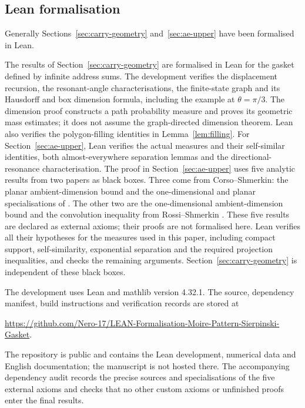 \documentclass[scheme=plain]{ctexart}
\begin{document}
\subsection{Lean formalisation}
Generally Sections~\ref{sec:carry-geometry} and~\ref{sec:ae-upper} have been formalised in Lean.

The results of Section~\ref{sec:carry-geometry} are formalised in Lean for the gasket defined by infinite address sums.
The development verifies the displacement recursion, the resonant-angle characterisations, the finite-state graph and its Hausdorff and box dimension formula, including the example at $\theta=\pi/3$.
The dimension proof constructs a path probability measure and proves its geometric mass estimates; it does not assume the graph-directed dimension theorem.
Lean also verifies the polygon-filling identities in Lemma~\ref{lem:filling}.
For Section~\ref{sec:ae-upper}, Lean verifies the actual measures and their self-similar identities, both almost-everywhere separation lemmas and the directional-resonance characterisation.
The proof in Section~\ref{sec:ae-upper} uses five analytic results from two papers as black boxes.
Three come from Corso--Shmerkin: the planar ambient-dimension bound \cite[Section~1.2]{corso2024dynamical} and the one-dimensional and planar specialisations of \cite[Corollary~4.2]{corso2024dynamical}.
The other two are the one-dimensional ambient-dimension bound and the convolution inequality from Rossi--Shmerkin \cite[Section~1, equation~(1.2)]{rossi2018measures}.
These five results are declared as external axioms; their proofs are not formalised here.
Lean verifies all their hypotheses for the measures used in this paper, including compact support, self-similarity, exponential separation and the required projection inequalities, and checks the remaining arguments.
Section~\ref{sec:carry-geometry} is independent of these black boxes.

The development uses Lean and mathlib version 4.32.1.
The source, dependency manifest, build instructions and verification records are stored at
\begin{center}
\url{https://github.com/Nero-17/LEAN-Formalisation-Moire-Pattern-Sierpinski-Gasket}.
\end{center}
The repository is public and contains the Lean development, numerical data and English documentation; the manuscript is not hosted there.
The accompanying dependency audit records the precise sources and specialisations of the five external axioms and checks that no other custom axioms or unfinished proofs enter the final results.
\end{document}
